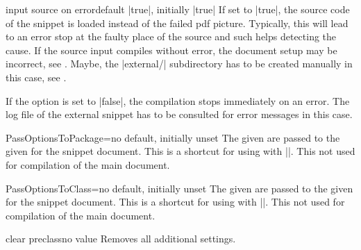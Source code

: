 \enlargethispage*{1cm}
\begin{extTcbKey}[][doc new=2015-03-11]{input source on error}{}{default |true|,
  initially |true|}
If set to |true|, the source code of the snippet is loaded instead of
the failed pdf picture. Typically, this will lead to an error stop at the
faulty place of the source and such helps detecting the cause.
If the source input compiles without error, the document setup
may be incorrect, see .
Maybe, the |external/| subdirectory has to be created manually in this case,
see .\par
If the option is set to |false|, the compilation stops immediately on an error.
The log file of the external snippet has to be consulted for error messages
in this case.
\end{extTcbKey}


\clearpage



\begin{extTcbKey}[][doc new=2015-05-05]{PassOptionsToPackage}{=}{no default,
  initially unset}
  The given  are passed to the given  for
  the snippet document. This is a shortcut for using 
  with |\PassOptionsToPackage|.
  This not used for compilation of the main document.
\end{extTcbKey}


\begin{extTcbKey}[][doc new=2015-05-05]{PassOptionsToClass}{=}{no default,
  initially unset}
  The given  are passed to the given  for
  the snippet document. This is a shortcut for using 
  with |\PassOptionsToClass|.
  This not used for compilation of the main document.
\end{extTcbKey}


\begin{extTcbKey}[][doc new=2015-05-05]{clear preclass}{}{no value}
  Removes all additional  settings.
\end{extTcbKey}



